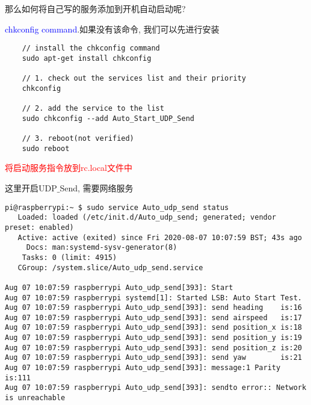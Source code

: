 那么如何将自己写的服务添加到开机自动启动呢? \par
\textcolor{blue}{chkconfig command}.如果没有该命令, 我们可以先进行安装
\begin{lstlisting}
    // install the chkconfig command
    sudo apt-get install chkconfig

    // 1. check out the services list and their priority
    chkconfig

    // 2. add the service to the list
    sudo chkconfig --add Auto_Start_UDP_Send 

    // 3. reboot(not verified)
    sudo reboot
\end{lstlisting}
\textcolor{red}{将启动服务指令放到rc.local文件中}\par
这里开启UDP$\_$Send, 需要网络服务
\begin{lstlisting}[title=查看服务的运行状态]
pi@raspberrypi:~ $ sudo service Auto_udp_send status
   Loaded: loaded (/etc/init.d/Auto_udp_send; generated; vendor preset: enabled)
   Active: active (exited) since Fri 2020-08-07 10:07:59 BST; 43s ago
     Docs: man:systemd-sysv-generator(8)
    Tasks: 0 (limit: 4915)
   CGroup: /system.slice/Auto_udp_send.service

Aug 07 10:07:59 raspberrypi Auto_udp_send[393]: Start
Aug 07 10:07:59 raspberrypi systemd[1]: Started LSB: Auto Start Test.
Aug 07 10:07:59 raspberrypi Auto_udp_send[393]: send heading    is:16
Aug 07 10:07:59 raspberrypi Auto_udp_send[393]: send airspeed   is:17
Aug 07 10:07:59 raspberrypi Auto_udp_send[393]: send position_x is:18
Aug 07 10:07:59 raspberrypi Auto_udp_send[393]: send position_y is:19
Aug 07 10:07:59 raspberrypi Auto_udp_send[393]: send position_z is:20
Aug 07 10:07:59 raspberrypi Auto_udp_send[393]: send yaw        is:21
Aug 07 10:07:59 raspberrypi Auto_udp_send[393]: message:1 Parity is:111
Aug 07 10:07:59 raspberrypi Auto_udp_send[393]: sendto error:: Network is unreachable
\end{lstlisting}
